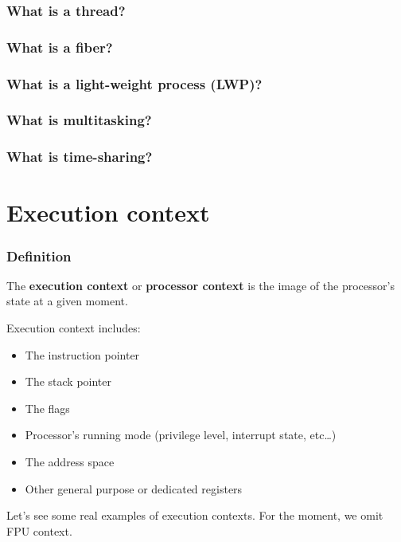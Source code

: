 
\begin{frame}
  \frametitle{What is a thread?}

\end{frame}


\begin{frame}
  \frametitle{What is a fiber?}

\end{frame}


\begin{frame}
  \frametitle{What is a light-weight process (LWP)?}

\end{frame}


\begin{frame}
  \frametitle{What is multitasking?}

\end{frame}


\begin{frame}
  \frametitle{What is time-sharing?}

\end{frame}

%
%

\section{Execution context}


\begin{frame}
  \frametitle{Definition}

  The \textbf{execution context} or \textbf{processor context} is the
  image of the processor's state at a given moment.

  Execution context includes:

  \begin{itemize}
  \item
    The instruction pointer
  \item
    The stack pointer
  \item
    The flags
  \item
    Processor's running mode (privilege level, interrupt state,
    etc\ldots)
  \item
    The address space
  \item
    Other general purpose or dedicated registers
  \end{itemize}

  \-

  Let's see some real examples of execution contexts. For the moment,
  we omit FPU context.

\end{frame}

